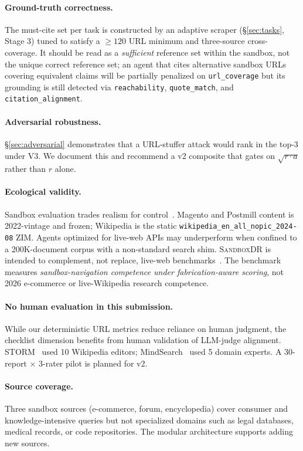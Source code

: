 \documentclass{article}
\newcommand{\ours}{\textsc{SandboxDR}}
\begin{document}
\paragraph{Ground-truth correctness.} The must-cite set per task is constructed by an adaptive scraper (\S\ref{sec:tasks}, Stage 3) tuned to satisfy a $\geq{}120$ URL minimum and three-source cross-coverage. It should be read as a \emph{sufficient} reference set within the sandbox, not the unique correct reference set; an agent that cites alternative sandbox URLs covering equivalent claims will be partially penalized on \texttt{url\_coverage} but its grounding is still detected via \texttt{reachability}, \texttt{quote\_match}, and \texttt{citation\_alignment}.

\paragraph{Adversarial robustness.} \S\ref{sec:adversarial} demonstrates that a URL-stuffer attack would rank in the top-3 under V3. We document this and recommend a v2 composite that gates on $\sqrt{r \cdot a}$ rather than $r$ alone.

\paragraph{Ecological validity.} Sandbox evaluation trades realism for control~\citep{deepresearchgym2025}. Magento and Postmill content is 2022-vintage and frozen; Wikipedia is the static \texttt{wikipedia\_en\_all\_nopic\_2024-08} ZIM. Agents optimized for live-web APIs may underperform when confined to a 200K-document corpus with a non-standard search shim. \ours{} is intended to complement, not replace, live-web benchmarks~\citep{drb2025,liveresearchbench2026}. The benchmark measures \emph{sandbox-navigation competence under fabrication-aware scoring}, not 2026 e-commerce or live-Wikipedia research competence.

\paragraph{No human evaluation in this submission.} While our deterministic URL metrics reduce reliance on human judgment, the checklist dimension benefits from human validation of LLM-judge alignment. STORM~\citep{storm2024} used 10 Wikipedia editors; MindSearch~\citep{mindsearch2025} used 5 domain experts. A 30-report $\times$ 3-rater pilot is planned for v2.

\paragraph{Source coverage.} Three sandbox sources (e-commerce, forum, encyclopedia) cover consumer and knowledge-intensive queries but not specialized domains such as legal databases, medical records, or code repositories. The modular architecture supports adding new sources.
\end{document}
